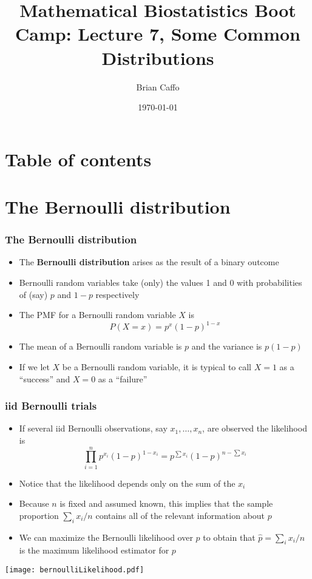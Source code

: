 \documentclass[aspectratio=169]{beamer}
\title{Mathematical Biostatistics Boot Camp: Lecture 7, Some Common Distributions}
\author{Brian Caffo}
\date{\today}
\institute[Department of Biostatistics]{
  Department of Biostatistics \\
  Johns Hopkins Bloomberg School of Public Health\\
  Johns Hopkins University
}
\begin{document}
\frame{\titlepage}


\section{Table of contents}


\section{The Bernoulli distribution}
\begin{frame}\frametitle{The Bernoulli distribution}
\begin{itemize}
\item The {\bf Bernoulli distribution} arises as the result of a
  binary outcome
\item Bernoulli random variables take (only) the values 1 and 0 with
  probabilities of (say) $p$ and $1-p$ respectively
\item The PMF for a Bernoulli random variable $X$ is
  $$P(X = x) =  p^x (1 - p)^{1 - x}$$
\item The mean of a Bernoulli random variable is $p$ and the variance
  is $p(1 - p)$
\item If we let $X$ be a Bernoulli random variable, it is typical to
  call $X=1$ as a ``success'' and $X=0$ as a ``failure''
\end{itemize}
\end{frame}


\begin{frame}\frametitle{iid Bernoulli trials}
\begin{itemize}
\item If several iid Bernoulli observations, say $x_1,\ldots, x_n$, are observed the
likelihood is 
$$
  \prod_{i=1}^n p^{x_i} (1 - p)^{1 - x_i} = p^{\sum x_i} (1 - p)^{n - \sum x_i}
$$
\item Notice that the likelihood depends only on the sum of the $x_i$
\item Because $n$ is fixed and assumed known, this implies that the
  sample proportion $\sum_i x_i / n$ contains all of the relevant
  information about $p$
\item We can maximize the Bernoulli likelihood over $p$ to obtain that
$\hat p = \sum_i x_i / n$ is the maximum likelihood estimator for $p$
\end{itemize}
\end{frame}


\begin{frame}
\texttt{[image: bernoulliLikelihood.pdf]}
\end{frame}
\end{document}
